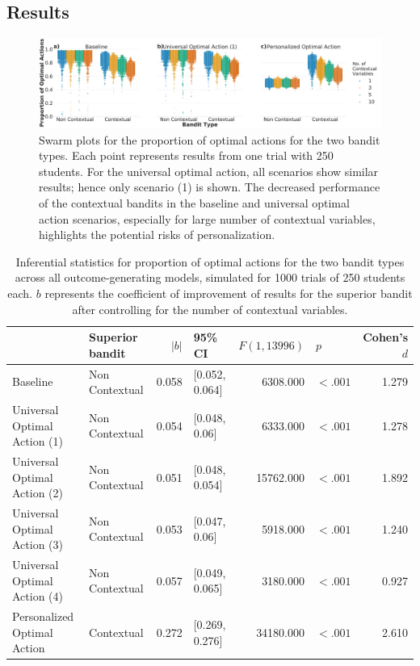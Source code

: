 \subsection{Results}

\begin{figure}[ht]
    \centering
    \includegraphics[width=\textwidth]{figs/NumConVars.pdf}
    \caption{Swarm plots for the proportion of optimal actions for the two bandit types. Each point represents results from one trial with 250 students. For the universal optimal action, all scenarios show similar results; hence only scenario (1) is shown. The decreased performance of the contextual bandits in the baseline and universal optimal action scenarios, especially for large number of contextual variables, highlights the potential risks of personalization.}
    \label{fig:NumConVars}
\end{figure}

\begin{table}[ht]
\begin{tabular*}{\textwidth}{@{\extracolsep{\fill}}llrlrlr}
\toprule
{} & Superior bandit &  $|b|$ &         95\% CI &  $F(1, 13996)$ &       $p$ &  Cohen's $d$ \\
\midrule
Baseline                     &  Non Contextual &  0.058 &  [0.052, 0.064] &       6308.000 &  $< .001$ &        1.279 \\
Universal Optimal Action (1) &  Non Contextual &  0.054 &   [0.048, 0.06] &       6333.000 &  $< .001$ &        1.278 \\
Universal Optimal Action (2) &  Non Contextual &  0.051 &  [0.048, 0.054] &      15762.000 &  $< .001$ &        1.892 \\
Universal Optimal Action (3) &  Non Contextual &  0.053 &   [0.047, 0.06] &       5918.000 &  $< .001$ &        1.240 \\
Universal Optimal Action (4) &  Non Contextual &  0.057 &  [0.049, 0.065] &       3180.000 &  $< .001$ &        0.927 \\
Personalized Optimal Action  &      Contextual &  0.272 &  [0.269, 0.276] &      34180.000 &  $< .001$ &        2.610 \\
\bottomrule
\end{tabular*}


\caption{Inferential statistics for proportion of optimal actions for the two bandit types across all outcome-generating models, simulated for 1000 trials of 250 students each. $b$ represents the coefficient of improvement of results for the superior bandit after controlling for the number of contextual variables.}
\label{table:resultsNumConVars}

\end{table}

